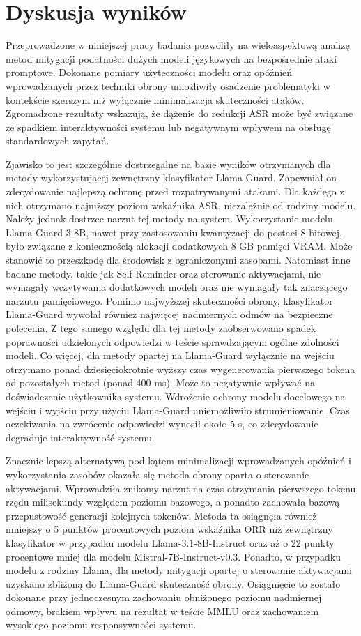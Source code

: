 \section{Dyskusja wyników}
Przeprowadzone w niniejszej pracy badania pozwoliły na wieloaspektową analizę metod mitygacji podatności dużych modeli językowych na bezpośrednie ataki promptowe. Dokonane pomiary użyteczności modelu oraz opóźnień wprowadzanych przez techniki obrony umożliwiły osadzenie problematyki w kontekście szerszym niż wyłącznie minimalizacja skuteczności ataków. Zgromadzone rezultaty wskazują, że dążenie do redukcji \gls{ASR} może być związane ze spadkiem interaktywności systemu lub negatywnym wpływem na obsługę standardowych zapytań.

Zjawisko to jest szczególnie dostrzegalne na bazie wyników otrzymanych dla metody wykorzystującej zewnętrzny klasyfikator Llama-Guard. Zapewniał on zdecydowanie najlepszą ochronę przed rozpatrywanymi atakami. Dla każdego z nich otrzymano najniższy poziom wskaźnika \gls{ASR}, niezależnie od rodziny modelu. Należy jednak dostrzec narzut tej metody na system. Wykorzystanie modelu Llama-Guard-3-8B, nawet przy zastosowaniu kwantyzacji do postaci 8-bitowej, było związane z koniecznością alokacji dodatkowych 8 GB pamięci VRAM. Może stanowić to przeszkodę dla środowisk z ograniczonymi zasobami. Natomiast inne badane metody, takie jak Self-Reminder oraz sterowanie aktywacjami, nie wymagały wczytywania dodatkowych modeli oraz nie wymagały tak znaczącego narzutu pamięciowego. Pomimo najwyższej skuteczności obrony, klasyfikator Llama-Guard wywołał również najwięcej nadmiernych odmów na bezpieczne polecenia. Z tego samego względu dla tej metody zaobserwowano spadek poprawności udzielonych odpowiedzi w teście sprawdzającym ogólne zdolności modeli. Co więcej, dla metody opartej na Llama-Guard wyłącznie na wejściu otrzymano ponad dziesięciokrotnie wyższy czas wygenerowania pierwszego tokena od pozostałych metod (ponad 400 ms). Może to negatywnie wpływać na doświadczenie użytkownika systemu. Wdrożenie ochrony modelu docelowego na wejściu i wyjściu przy użyciu Llama-Guard uniemożliwiło strumieniowanie. Czas oczekiwania na zwrócenie odpowiedzi wynosił około 5 s, co zdecydowanie degraduje interaktywność systemu.

Znacznie lepszą alternatywą pod kątem minimalizacji wprowadzanych opóźnień i wykorzystania zasobów okazała się metoda obrony oparta o sterowanie aktywacjami. Wprowadziła znikomy narzut na czas otrzymania pierwszego tokenu rzędu milisekundy względem poziomu bazowego, a ponadto zachowała bazową przepustowość generacji kolejnych tokenów. Metoda ta osiągnęła również mniejszy o 5 punktów procentowych poziom wskaźnika \gls{ORR} niż zewnętrzny klasyfikator w przypadku modelu Llama-3.1-8B-Instruct oraz aż o 22 punkty procentowe mniej dla modelu Mistral-7B-Instruct-v0.3. Ponadto, w przypadku modelu z rodziny Llama, dla metody mitygacji opartej o sterowanie aktywacjami uzyskano zbliżoną do Llama-Guard skuteczność obrony. Osiągnięcie to zostało dokonane przy jednoczesnym zachowaniu obniżonego poziomu nadmiernej odmowy, brakiem wpływu na rezultat w teście MMLU oraz zachowaniem wysokiego poziomu responsywności systemu.

